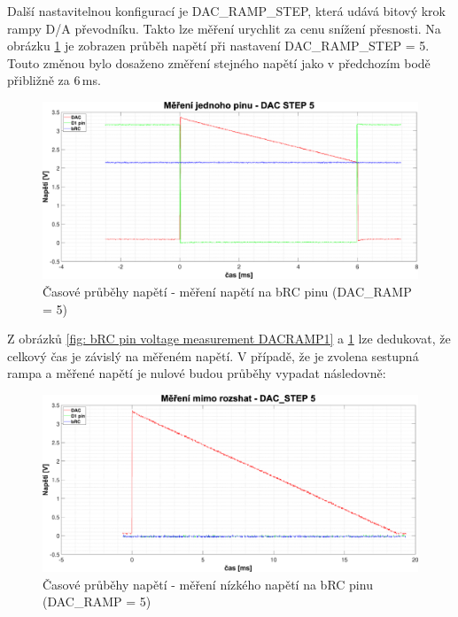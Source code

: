 Další nastavitelnou konfigurací je DAC\_RAMP\_STEP, která udává bitový krok rampy D/A převodníku. Takto lze měření urychlit za cenu snížení přesnosti.
Na obrázku \ref{fig: bRC pin voltage measurement DACRAMP5} je zobrazen průběh napětí při nastavení DAC\_RAMP\_STEP = 5. Touto změnou
bylo dosaženo změření stejného napětí jako v předchozím bodě přibližně za 6\,ms.\par
\clearpage
\begin{figure}[ht!]
    \centering
    \includegraphics[width = 1\textwidth]{obrazky/matlab_generated/pin_step5.eps}
    \caption{Časové průběhy napětí - měření napětí na bRC pinu (DAC\_RAMP = 5)}
    \label{fig: bRC pin voltage measurement DACRAMP5}
\end{figure}

Z obrázků \ref{fig: bRC pin voltage measurement DACRAMP1} a \ref{fig: bRC pin voltage measurement DACRAMP5} lze dedukovat, že celkový čas je závislý 
na měřeném napětí. V případě, že je zvolena sestupná rampa a měřené napětí je nulové budou průběhy vypadat následovně:
\begin{figure}[ht!]
    \centering
    \includegraphics[width = 1\textwidth]{obrazky/matlab_generated/pin_out_of_range.eps}
    \caption{Časové průběhy napětí - měření nízkého napětí na bRC pinu (DAC\_RAMP = 5)}
    \label{fig: bRC pin voltage measurement low Voltage}
\end{figure}


